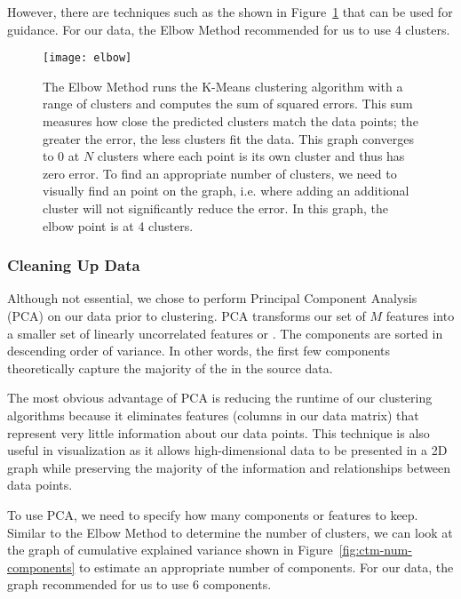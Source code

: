 However, there are techniques such as the  \cite{thorndike1953belongs} shown in Figure~\ref{fig:ctm-num-clusters} that can be used for guidance. For our data, the Elbow Method recommended for us to use 4 clusters.

\begin{figure}
\texttt{[image: elbow]}
\caption[Using Elbow Method to find Optimal Number of Clusters]{The Elbow Method runs the K-Means clustering algorithm with a range of clusters and computes the sum of squared errors. This sum measures how close the predicted clusters match the data points; the greater the error, the less clusters fit the data. This graph converges to 0 at $N$ clusters where each point is its own cluster and thus has zero error. To find an appropriate number of clusters, we need to visually find an  point on the graph, i.e. where adding an additional cluster will not significantly reduce the error. In this graph, the elbow point is at 4 clusters.}
\label{fig:ctm-num-clusters}
\end{figure}

\subsubsection{Cleaning Up Data}

Although not essential, we chose to perform Principal Component Analysis (PCA) \cite{wold1987principal} on our data prior to clustering. PCA transforms our set of $M$ features into a smaller set of linearly uncorrelated features or . The components are sorted in descending order of variance. In other words, the first few components theoretically capture the majority of the  in the source data.

The most obvious advantage of PCA is reducing the runtime of our clustering algorithms because it eliminates features (columns in our data matrix) that represent very little information about our data points. This technique is also useful in visualization as it allows high-dimensional data to be presented in a 2D graph while preserving the majority of the information and relationships between data points.

To use PCA, we need to specify how many components or features to keep. Similar to the Elbow Method to determine the number of clusters, we can look at the graph of cumulative explained variance shown in Figure~\ref{fig:ctm-num-components} to estimate an appropriate number of components. For our data, the graph recommended for us to use 6 components.

